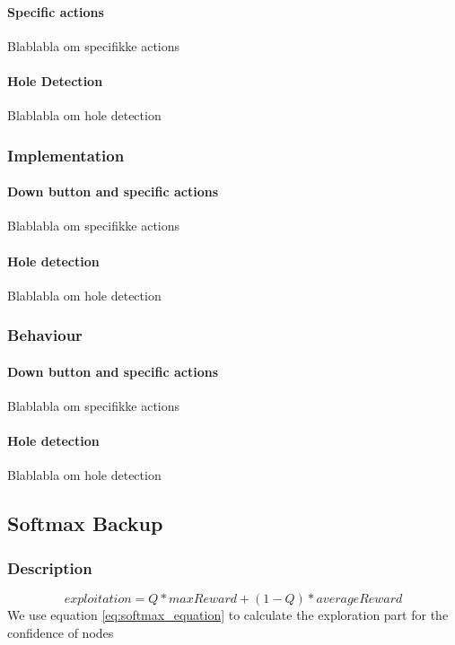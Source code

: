 \documentclass[10pt,a4paper]{article}
\begin{document}
\paragraph{Specific actions}
Blablabla om specifikke actions

\paragraph{Hole Detection}
\label{hole}
Blablabla om hole detection

\subsubsection{Implementation}

\paragraph{Down button and specific actions}
Blablabla om specifikke actions
\paragraph{Hole detection}
Blablabla om hole detection

\subsubsection{Behaviour}

\paragraph{Down button and specific actions}
Blablabla om specifikke actions
\paragraph{Hole detection}
Blablabla om hole detection

\subsection{Softmax Backup}
\subsubsection{Description}
\begin{equation}\label{eq:softmax_equation}
exploitation = Q * maxReward + (1 - Q ) * averageReward
\end{equation}
We use equation \ref{eq:softmax_equation} to calculate the exploration part for the confidence of nodes
\end{document}
